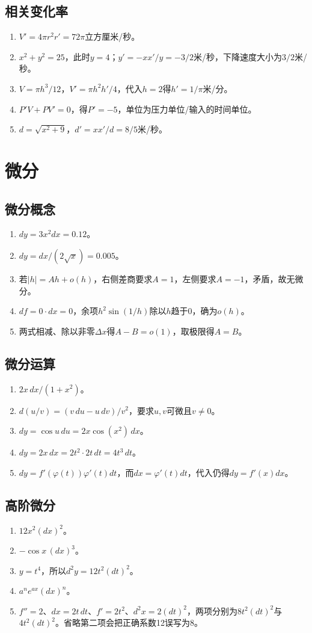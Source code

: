 \documentclass[11pt,a4paper,fontset=fandol]{ctexrep}
\begin{document}
\subsection{相关变化率}
\begin{enumerate}
\item $V'=4\pi r^2r'=72\pi$立方厘米/秒。
\item $x^2+y^2=25$，此时$y=4$；$y'=-xx'/y=-3/2$米/秒，下降速度大小为$3/2$米/秒。
\item $V=\pi h^3/12$，$V'=\pi h^2h'/4$，代入$h=2$得$h'=1/\pi$米/分。
\item $P'V+PV'=0$，得$P'=-5$，单位为压力单位/输入的时间单位。
\item $d=\sqrt{x^2+9}$，$d'=xx'/d=8/5$米/秒。
\end{enumerate}
\section{微分}
\subsection{微分概念}
\begin{enumerate}
\item $dy=3x^2dx=0.12$。
\item $dy=dx/(2\sqrt x)=0.005$。
\item 若$|h|=Ah+o(h)$，右侧差商要求$A=1$，左侧要求$A=-1$，矛盾，故无微分。
\item $df=0\cdot dx=0$，余项$h^2\sin(1/h)$除以$h$趋于0，确为$o(h)$。
\item 两式相减、除以非零$\Delta x$得$A-B=o(1)$，取极限得$A=B$。
\end{enumerate}
\subsection{微分运算}
\begin{enumerate}
\item $2x\,dx/(1+x^2)$。
\item $d(u/v)=(v\,du-u\,dv)/v^2$，要求$u,v$可微且$v\ne0$。
\item $dy=\cos u\,du=2x\cos(x^2)\,dx$。
\item $dy=2x\,dx=2t^2\cdot2t\,dt=4t^3\,dt$。
\item $dy=f'(\varphi(t))\varphi'(t)dt$，而$dx=\varphi'(t)dt$，代入仍得$dy=f'(x)dx$。
\end{enumerate}
\subsection{高阶微分}
\begin{enumerate}
\item $12x^2(dx)^2$。
\item $-\cos x\,(dx)^3$。
\item $y=t^4$，所以$d^2y=12t^2(dt)^2$。
\item $a^n e^{ax}(dx)^n$。
\item $f''=2$、$dx=2t\,dt$、$f'=2t^2$、$d^2x=2(dt)^2$，两项分别为$8t^2(dt)^2$与$4t^2(dt)^2$。省略第二项会把正确系数12误写为8。
\end{enumerate}
\end{document}
